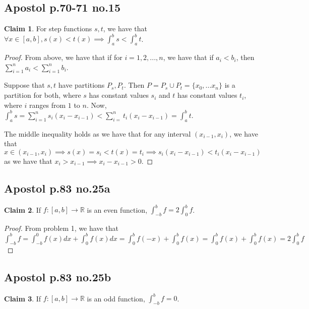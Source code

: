\documentclass[12pt,letterpaper]{article}
\theoremstyle{definition}
\newtheorem*{claim}{Claim}
\newcommand{\R}{\mathbb{R}}
\begin{document}
\subsection*{Apostol p.70-71 no.15}

\begin{claim}
  For step functions $s,t$, we have that $\forall x \in [a,b], s(x) < t(x) \implies \int_a^b s < \int_a^b t$.
\end{claim}

\begin{proof}
  From above, we have that if for $i = 1,2,...,n$, we have that if $a_i < b_i$, then $\sum_{i=1}^na_i < \sum_{i=1}^nb_i$.
  
  Suppose that $s,t$ have partitions $P_s, P_t$. Then $P = P_s \cup P_t = \{x_0,...x_n\}$ is a partition for both, where $s$ has constant values $s_i$ and $t$ has constant values $t_i$, where $i$ ranges from $1$ to $n$.
  Now, $\int_a^b s = \sum_{i=1}^n s_i(x_i - x_{i-1}) < \sum_{i=}^n t_i(x_i - x_{i-1}) = \int_a^b t$.
  
  The middle inequality holds as we have that for any interval $(x_{i-1},x_i)$, we have that $x \in (x_{i-1},x_i) \implies s(x) = s_i < t(x) = t_i \implies s_i(x_i - x_{i-1}) < t_i(x_i - x_{i-1})$ as we have that $x_i > x_{i-1} \implies x_i - x_{i-1} > 0$.
  
\end{proof}

\subsection*{Apostol p.83 no.25a}

\begin{claim}
  If $f:[a,b] \rightarrow \R$ is an even function, $\int_{-b}^b f = 2\int_0^b f$.
\end{claim}

\begin{proof}
  From problem 1, we have that $\int_{-b}^b f = \int_{-b}^0f(x)dx  + \int_0^b f(x)dx = \int_0^b f(-x) + \int_0^b f(x)  = \int_0^b f(x) + \int_0^b f(x) = 2\int_0^b f $
\end{proof}

\subsection*{Apostol p.83 no.25b}

\begin{claim}
  If $f:[a,b] \rightarrow \R$ is an odd function, $\int_{-b}^b f = 0$.
\end{claim}
\end{document}
